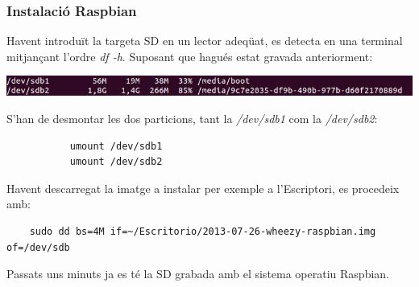 \documentclass[twoside]{article}
\begin{document}
\subsubsection*{Instalació Raspbian}
Havent introduït la targeta SD en un lector adeqüat, es detecta en una terminal mitjançant l'ordre \textit{df -h}. Suposant que hagués estat gravada anteriorment:
\begin{center}
\includegraphics[scale=0.7]{InstalRasp1.jpeg}
\end{center}
S'han de desmontar les dos particions, tant la \textit{/dev/sdb1} com la \textit{/dev/sdb2}:
\begin{verbatim}
           umount /dev/sdb1
           umount /dev/sdb2
\end{verbatim}
Havent descarregat la imatge a instalar per exemple a l'Escriptori, es procedeix amb:
\begin{verbatim}
    sudo dd bs=4M if=~/Escritorio/2013-07-26-wheezy-raspbian.img of=/dev/sdb
\end{verbatim}
Passats uns minuts ja es té la SD grabada amb el sistema operatiu Raspbian.
\end{document}
